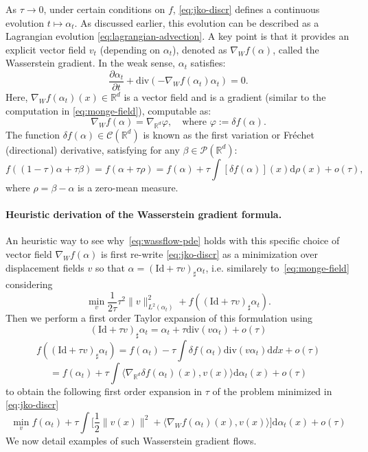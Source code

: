 As $\tau \to 0$, under certain conditions on $f$, \eqref{eq:jko-discr} defines a continuous evolution $t \mapsto \alpha_t$. As discussed earlier, this evolution can be described as a Lagrangian evolution \eqref{eq:lagrangian-advection}. A key point is that it provides an explicit vector field $v_t$ (depending on $\alpha_t$), denoted as $\nabla_W f(\alpha)$, called the Wasserstein gradient. In the weak sense, $\alpha_t$ satisfies:
\begin{equation}
    \frac{\partial \alpha_t}{\partial t} + \mathrm{div}(-\nabla_W f(\alpha_t) \alpha_t) = 0. \label{eq:wassflow-pde}
\end{equation}
Here, $\nabla_W f(\alpha_t)(x) \in \mathbb{R}^d$ is a vector field and is a gradient (similar to the computation in \eqref{eq:monge-field}), computable as:
\begin{equation}
    \nabla_W f(\alpha) = \nabla_{\mathbb{R}^d} \varphi, \quad \text{where } \varphi := \delta f(\alpha).
\end{equation}
The function $\delta f(\alpha) \in \mathcal{C}(\mathbb{R}^d)$ is known as the first variation or Fr\'echet (directional) derivative, satisfying for any $\beta \in \mathcal{P}(\mathbb{R}^d)$:
\begin{equation}
    f((1-\tau)\alpha + \tau \beta) = f(\alpha + \tau \rho) = f(\alpha) + \tau \int [\delta f(\alpha)](x) \mathrm{d} \rho(x) + o(\tau),
\end{equation}
where $\rho = \beta - \alpha$ is a zero-mean measure.

\paragraph{Heuristic derivation of the Wasserstein gradient formula.}

An heuristic way to see why~\eqref{eq:wassflow-pde} holds with this specific choice of vector field $\nabla_W f(\alpha)$ is first re-write \eqref{eq:jko-discr} as a minimization over displacement fields $v$ so that $\alpha = (\mathrm{Id} + \tau v)_\sharp \alpha_t$, i.e. similarely to~\eqref{eq:monge-field} considering
$$
	\min_{v} \frac{1}{2 \tau} \tau^2 \|v\|_{L^2(\alpha_t)}^2 + f( (\mathrm{Id} + \tau v)_\sharp \alpha_t ).
$$
Then we perform a first order Taylor expansion of this formulation using 
$$
	 (\mathrm{Id} + \tau v)_\sharp \alpha_t =  \alpha_t + \tau \mathrm{div}( v \alpha_t ) + o(\tau)
$$
$$
	f( (\mathrm{Id} + \tau v)_\sharp \alpha_t ) = f(\alpha_t) - \tau \int \delta f(\alpha_t) \mathrm{div}( v \alpha_t ) \mathrm{d} d x + o(\tau)
$$
$$
	 = f(\alpha_t) + \tau \int \langle \nabla_{\mathbb{R}^d} \delta f(\alpha_t)(x), v(x) \rangle \mathrm{d} \alpha_t(x) + o(\tau)
$$
to obtain the following first order expansion in $\tau$ of the problem minimized in  \eqref{eq:jko-discr}
$$
	 \min_{v} f(\alpha_t) +  \tau \int \Big[ \frac{1}{2} \|v(x)\|^2 + \langle \nabla_{W} f(\alpha_t)(x), v(x) \rangle \Big]\mathrm{d} \alpha_t(x) + o(\tau)
$$
We now detail examples of such Wasserstein gradient flows.

